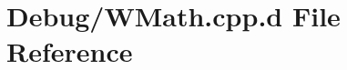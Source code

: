 \hypertarget{_debug_2_w_math_8cpp_8d}{\section{\-Debug/\-W\-Math.cpp.\-d \-File \-Reference}
\label{_debug_2_w_math_8cpp_8d}
}
